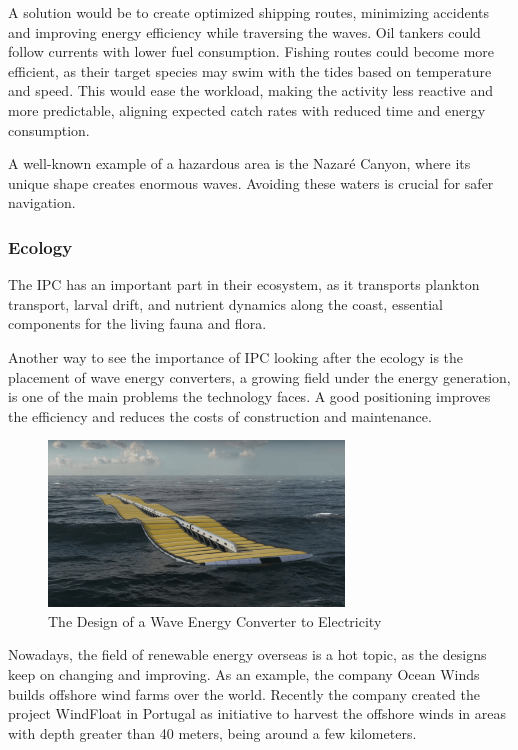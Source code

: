 A solution would be to create optimized shipping routes, minimizing accidents and improving energy efficiency while 
traversing the waves. Oil tankers could follow currents with lower fuel consumption. Fishing routes could become more
efficient, as their target species may swim with the tides based on temperature and speed. This would ease the workload,
making the activity less reactive and more predictable, aligning expected catch rates with reduced time and energy 
consumption.

A well-known example of a hazardous area is the Nazaré Canyon, where its unique shape creates enormous waves. 
Avoiding these waters is crucial for safer navigation.

\subsubsection{Ecology}

The IPC has an important part in their ecosystem, as it transports plankton transport, larval drift, and 
nutrient dynamics along the coast, essential components for the living fauna and flora.


Another way to see the importance of IPC looking after the ecology is the placement of wave energy converters, a 
growing field under the energy generation, is one of the main problems the technology faces. 
A good positioning improves the efficiency and reduces the costs of construction and maintenance.
\begin{figure}[H]
    \centering
    \includegraphics[width=0.7\textwidth]{images/chapter/introduction/renewable_energy.png}  %
    \caption{The Design of a Wave Energy Converter to Electricity}
    \label{fig:The Design of a Wave Energy Converter to Electricity}        
\end{figure}

Nowadays, the field of renewable energy overseas is a hot topic, as the designs keep on changing and improving. As an example, the company
Ocean Winds builds offshore wind farms over the world. Recently the company created the project WindFloat in Portugal as initiative
to harvest the offshore winds in areas with depth greater than 40 meters, being around a few kilometers.

